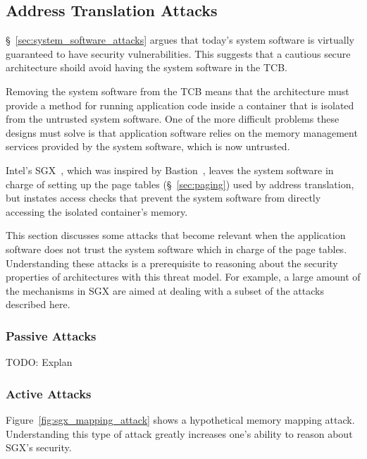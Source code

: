 \subsection{Address Translation Attacks}
\label{sec:paging_attacks}

\S~\ref{sec:system_software_attacks} argues that today's system software is
virtually guaranteed to have security vulnerabilities. This suggests that a
cautious secure architecture shoild avoid having the system software in the
TCB.

Removing the system software from the TCB means that the architecture must
provide a method for running application code inside a container that is
isolated from the untrusted system software. One of the more difficult problems
these designs must solve is that application software relies on the memory
management services provided by the system software, which is now untrusted.

Intel's SGX~\cite{mckeen2013sgx, anati2013sgx}, which was inspired by
Bastion~\cite{champagne2010bastion}, leaves the system software in charge of
setting up the page tables (\S~\ref{sec:paging}) used by address translation,
but instates access checks that prevent the system software from directly
accessing the isolated container's memory.

This section discusses some attacks that become relevant when the application
software does not trust the system software which in charge of the page tables.
Understanding these attacks is a prerequisite to reasoning about the security
properties of architectures with this threat model. For example, a large amount
of the mechanisms in SGX are aimed at dealing with a subset of the attacks
described here.


\subsubsection{Passive Attacks}
\label{sec:fault_tracking_attacks}


TODO: Explan \cite{xu2015pagefaults}


\subsubsection{Active Attacks}
\label{sec:memory_mapping_attacks}

Figure~\ref{fig:sgx_mapping_attack} shows a hypothetical memory mapping attack.
Understanding this type of attack
greatly increases one's ability to reason about SGX's security.

